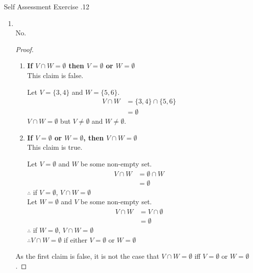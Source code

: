 \documentclass[../notes.tex]{subfiles}
\begin{document}
\begin{exercise}{Self Assessment Exercise \thechapter.12}
\begin{enumerate}
\begin{proof}
						\end{proof}
					\item {}\\
						No.
						\begin{proof}
							$ $
							\begin{enumerate}[label=(\roman*)]
								\item \textbf{If $V \cap W = \emptyset$ then $V = \emptyset$ or $W = \emptyset$}\\
									This claim is false.
									\begin{subproof}[Counterexample]
										Let $V = \{3, 4\}$ and $W = \{5, 6\}$.
										\begin{align*}
											V \cap W &= \{3, 4\} \cap \{5, 6\}\\
											&= \emptyset
										\end{align*}
										$V \cap W = \emptyset$ but $V \neq \emptyset$ and $W \neq \emptyset$.
									\end{subproof}
								\item \textbf{If $V = \emptyset$ or $W = \emptyset$, then $V \cap W = \emptyset$}\\
									This claim is true.
									\begin{subproof}[Subproof]
										Let $V = \emptyset$ and $W$ be some non-empty set.
										\begin{align*}
											V \cap W &= \emptyset \cap W\\
											&= \emptyset
										\end{align*}
										$\therefore$ if $V = \emptyset$, $V \cap W = \emptyset$\\
										Let $W = \emptyset$ and $V$ be some non-empty set.
										\begin{align*}
											V \cap W &= V \cap \emptyset\\
											&= \emptyset
										\end{align*}
										$\therefore$ if $W = \emptyset$, $V \cap W = \emptyset$\\
										$\therefore V \cap W = \emptyset$ if either $V = \emptyset$ or $W = \emptyset$
									\end{subproof}
							\end{enumerate}
							As the first claim is false, it is not the case that $V \cap W = \emptyset$ iff $V = \emptyset$ or $W = \emptyset$.
						\end{proof}

\end{enumerate}
\end{exercise}
\end{document}
